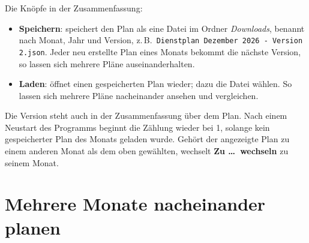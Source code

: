 \documentclass[11pt]{combiArticle}
\newcommand{\code}[1]{\texttt{#1}}
\newcommand{\knopf}[1]{\textbf{#1}}
\begin{document}
Die Knöpfe in der Zusammenfassung:
\begin{itemize}
  \item \knopf{Speichern}: speichert den Plan als eine Datei im Ordner \emph{Downloads}, benannt nach Monat, Jahr
        und Version, z.\,B.\ \code{Dienstplan Dezember 2026 - Version 2.json}. Jeder neu erstellte Plan eines
        Monats bekommt die nächste Version, so lassen sich mehrere Pläne auseinanderhalten.
  \item \knopf{Laden}: öffnet einen gespeicherten Plan wieder; dazu die Datei wählen. So lassen sich mehrere
        Pläne nacheinander ansehen und vergleichen.
\end{itemize}
Die Version steht auch in der Zusammenfassung über dem Plan. Nach einem Neustart des Programms beginnt die
Zählung wieder bei 1, solange kein gespeicherter Plan des Monats geladen wurde. Gehört der angezeigte Plan zu
einem anderen Monat als dem oben gewählten, wechselt \knopf{Zu \dots\ wechseln} zu seinem Monat.

\section{Mehrere Monate nacheinander planen}\label{sec:monate}
\end{document}
